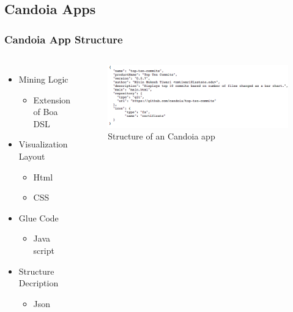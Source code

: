     \subsection{Candoia Apps}
        \begin{frame}
        \frametitle{Candoia App Structure}
        \begin{columns}
                \begin{itemize}
                  \item Mining Logic
                    \begin{itemize}
                        \item Extension of Boa DSL
                    \end{itemize}
                  \item Visualization Layout
                    \begin{itemize}
                        \item Html
                        \item CSS
                    \end{itemize}
                  \item Glue Code
                    \begin{itemize}
                        \item Java script
                    \end{itemize}
                  \item Structure Decription
                    \begin{itemize}
                        \item Json %
                    \end{itemize}
                \end{itemize}

                \begin{figure}
                    \centering
                    \includegraphics[scale=0.28]{figures/structure.png}
                    \caption{Structure of an Candoia app}
                \end{figure}
        \end{columns}
        \end{frame}

